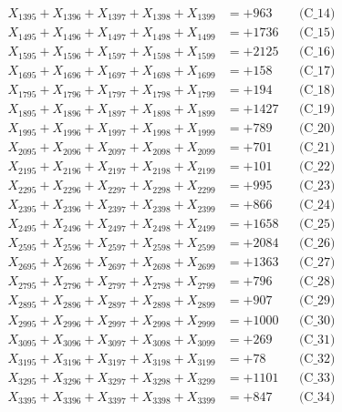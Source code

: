 \documentclass[a4paper,10pt]{article}
\begin{document}
{\begin{align}
X_{1395} + X_{1396} + X_{1397} + X_{1398} + X_{1399} &= +963 && \text{(C\_14)} \\
X_{1495} + X_{1496} + X_{1497} + X_{1498} + X_{1499} &= +1736 && \text{(C\_15)} \\
\allowbreak
X_{1595} + X_{1596} + X_{1597} + X_{1598} + X_{1599} &= +2125 && \text{(C\_16)} \\
X_{1695} + X_{1696} + X_{1697} + X_{1698} + X_{1699} &= +158 && \text{(C\_17)} \\
X_{1795} + X_{1796} + X_{1797} + X_{1798} + X_{1799} &= +194 && \text{(C\_18)} \\
X_{1895} + X_{1896} + X_{1897} + X_{1898} + X_{1899} &= +1427 && \text{(C\_19)} \\
X_{1995} + X_{1996} + X_{1997} + X_{1998} + X_{1999} &= +789 && \text{(C\_20)} \\
\allowbreak
X_{2095} + X_{2096} + X_{2097} + X_{2098} + X_{2099} &= +701 && \text{(C\_21)} \\
X_{2195} + X_{2196} + X_{2197} + X_{2198} + X_{2199} &= +101 && \text{(C\_22)} \\
X_{2295} + X_{2296} + X_{2297} + X_{2298} + X_{2299} &= +995 && \text{(C\_23)} \\
X_{2395} + X_{2396} + X_{2397} + X_{2398} + X_{2399} &= +866 && \text{(C\_24)} \\
X_{2495} + X_{2496} + X_{2497} + X_{2498} + X_{2499} &= +1658 && \text{(C\_25)} \\
\allowbreak
X_{2595} + X_{2596} + X_{2597} + X_{2598} + X_{2599} &= +2084 && \text{(C\_26)} \\
X_{2695} + X_{2696} + X_{2697} + X_{2698} + X_{2699} &= +1363 && \text{(C\_27)} \\
X_{2795} + X_{2796} + X_{2797} + X_{2798} + X_{2799} &= +796 && \text{(C\_28)} \\
X_{2895} + X_{2896} + X_{2897} + X_{2898} + X_{2899} &= +907 && \text{(C\_29)} \\
X_{2995} + X_{2996} + X_{2997} + X_{2998} + X_{2999} &= +1000 && \text{(C\_30)} \\
\allowbreak
X_{3095} + X_{3096} + X_{3097} + X_{3098} + X_{3099} &= +269 && \text{(C\_31)} \\
X_{3195} + X_{3196} + X_{3197} + X_{3198} + X_{3199} &= +78 && \text{(C\_32)} \\
X_{3295} + X_{3296} + X_{3297} + X_{3298} + X_{3299} &= +1101 && \text{(C\_33)} \\
X_{3395} + X_{3396} + X_{3397} + X_{3398} + X_{3399} &= +847 && \text{(C\_34)} \\

\end{align}}
\end{document}
